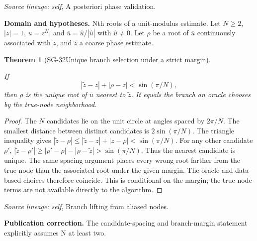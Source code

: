 \documentclass[11pt]{article}
\newtheorem{theorem}{Theorem}[section]
\theoremstyle{definition}\newtheorem{definition}[theorem]{Definition}
\theoremstyle{remark}\newtheorem{remark}[theorem]{Remark}
\begin{document}
\par{\small\color{Teal}\textit{Source lineage:} \textit{self}, A posteriori phase validation.}\par

\par{\small\textbf{Domain and hypotheses.} Nth roots of a unit-modulus estimate. Let $N\ge2$, $|z|=1$, $u=z^N$, and $\overline u=\widehat u/|\widehat u|$ with $\widehat u\ne0$. Let $\rho$ be a root of $\overline u$ continuously associated with $z$, and $\widetilde z$ a coarse phase estimate.}\par
\begin{theorem}[SG-32\quad Unique branch selection under a strict margin]\label{SG-32}

If
\[
 |\widetilde z-z|+|\rho-z|<\sin(\pi/N),
\]
then $\rho$ is the unique root of $\overline u$ nearest to $\widetilde z$.
It equals the branch an oracle chooses by the true-node neighborhood.

\end{theorem}
\begin{proof}

The $N$ candidates lie on the unit circle at angles spaced by $2\pi/N$.
The smallest distance between distinct candidates is $2\sin(\pi/N)$.
The triangle inequality gives
$|\widetilde z-\rho|\le|\widetilde z-z|+|z-\rho|<\sin(\pi/N)$.
For any other candidate $\rho'$,
$|\widetilde z-\rho'|\ge|\rho'-\rho|-|\rho-\widetilde z|
>\sin(\pi/N)$. Thus the nearest candidate is unique. The same spacing
argument places every wrong root farther from the true node than the
associated root under the given margin. The oracle and data-based choices
therefore coincide. This is conditional on the margin; the true-node terms
are not available directly to the algorithm.

\end{proof}

\par{\small\color{Teal}\textit{Source lineage:} \textit{self}, Branch lifting from aliased nodes.}\par

\par{\small\textbf{Publication correction.} The candidate-spacing and branch-margin statement explicitly assumes N at least two.}\par
\end{document}
